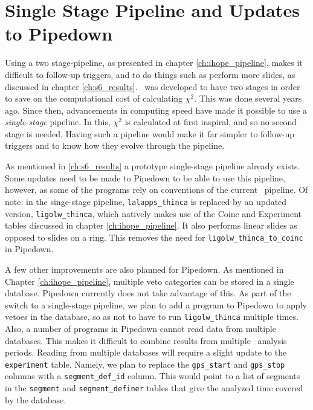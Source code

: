 \section{Single Stage Pipeline and Updates to Pipedown}

Using a two stage-pipeline, as presented in chapter \ref{ch:ihope_pipeline},
makes it difficult to follow-up triggers, and to do things such as perform more
slides, as discussed in chapter \ref{ch:s6_results}. \hipe~was developed to have
two stages in order to save on the computational cost of calculating $\chi^2$.
This was done several years ago. Since then, advancements in computing speed
have made it possible to use a \emph{single-stage} pipeline. In this, $\chi^2$
is calculated at first inspiral, and so no second stage is needed. Having such
a pipeline would make it far simpler to follow-up triggers and to know how they
evolve through the pipeline.

As mentioned in \ref{ch:s6_results} a prototype single-stage pipeline already
exists. Some updates need to be made to Pipedown to be able to use this
pipeline, however, as some of the programs rely on conventions of the current
\hipe~pipeline. Of note: in the singe-stage pipeline, \verb|lalapps_thinca|
is replaced by an updated version, \verb|ligolw_thinca|, which natively makes
use of the Coinc and Experiment tables discussed in chapter
\ref{ch:ihope_pipeline}. It also performs linear slides as opposed to slides on
a ring. This removes the need for \verb|ligolw_thinca_to_coinc| in Pipedown.

A few other improvements are also planned for Pipedown. As mentioned in Chapter
\ref{ch:ihope_pipeline}, multiple veto categories can be stored in a single
database. Pipedown currently does not take advantage of this. As part of the
switch to a single-stage pipeline, we plan to add a program to Pipedown to
apply vetoes in the database, so as not to have to run \verb|ligolw_thinca|
multiple times. Also, a number of programs in Pipedown cannot read data from
multiple databases. This makes it difficult to combine results from multiple
\ihope~analysis periods. Reading from multiple databases will require a slight
update to the \verb|experiment| table. Namely, we plan to replace the
\verb|gps_start| and \verb|gps_stop| columns with a \verb|segment_def_id|
column. This would point to a list of segments in the \verb|segment| and
\verb|segment_definer| tables that give the analyzed time covered by the
database.

